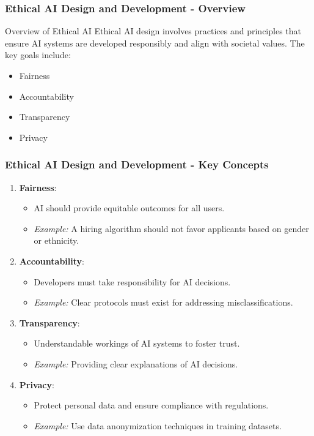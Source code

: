 \documentclass[aspectratio=169]{beamer}
\begin{document}
\begin{frame}[fragile]
  \frametitle{Ethical AI Design and Development - Overview}
  \begin{block}{Overview of Ethical AI}
    Ethical AI design involves practices and principles that ensure AI systems are developed responsibly and align with societal values. The key goals include:
    \begin{itemize}
      \item Fairness
      \item Accountability
      \item Transparency
      \item Privacy
    \end{itemize}
  \end{block}
\end{frame}

\begin{frame}[fragile]
  \frametitle{Ethical AI Design and Development - Key Concepts}
  \begin{enumerate}
    \item \textbf{Fairness}: 
    \begin{itemize}
      \item AI should provide equitable outcomes for all users.
      \item \textit{Example:} A hiring algorithm should not favor applicants based on gender or ethnicity.
    \end{itemize}

    \item \textbf{Accountability}: 
    \begin{itemize}
      \item Developers must take responsibility for AI decisions.
      \item \textit{Example:} Clear protocols must exist for addressing misclassifications.
    \end{itemize}

    \item \textbf{Transparency}: 
    \begin{itemize}
      \item Understandable workings of AI systems to foster trust.
      \item \textit{Example:} Providing clear explanations of AI decisions.
    \end{itemize}

    \item \textbf{Privacy}: 
    \begin{itemize}
      \item Protect personal data and ensure compliance with regulations.
      \item \textit{Example:} Use data anonymization techniques in training datasets.
    \end{itemize}
  \end{enumerate}
\end{frame}
\end{document}
